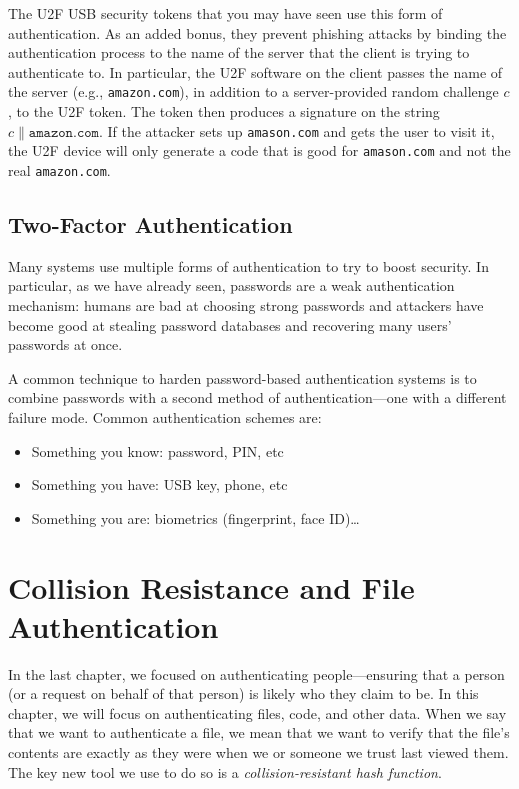 \documentclass[
  letterpaper,
]{scrbook}
\providecommand{\tightlist}{%
  \setlength{\itemsep}{0pt}\setlength{\parskip}{0pt}}
\theoremstyle{definition}
\theoremstyle{plain}
\theoremstyle{plain}
\theoremstyle{remark}
\begin{document}
The U2F USB security tokens that you may have seen use this form of
authentication. As an added bonus, they prevent phishing attacks by
binding the authentication process to the name of the server that the
client is trying to authenticate to. In particular, the U2F software on
the client passes the name of the server (e.g., \texttt{amazon.com}), in
addition to a server-provided random challenge \(c\), to the U2F token.
The token then produces a signature on the string
\(c\|\mathtt{amazon.com}\). If the attacker sets up \texttt{amason.com}
and gets the user to visit it, the U2F device will only generate a code
that is good for \texttt{amason.com} and not the real
\texttt{amazon.com}.

\section{Two-Factor Authentication}\label{two-factor-authentication}

Many systems use multiple forms of authentication to try to boost
security. In particular, as we have already seen, passwords are a weak
authentication mechanism: humans are bad at choosing strong passwords
and attackers have become good at stealing password databases and
recovering many users' passwords at once.

A common technique to harden password-based authentication systems is to
combine passwords with a second method of authentication---one with a
different failure mode. Common authentication schemes are:

\begin{itemize}
\tightlist
\item
  Something you know: password, PIN, etc
\item
  Something you have: USB key, phone, etc
\item
  Something you are: biometrics (fingerprint, face ID)\ldots{}
\end{itemize}

\chapter{Collision Resistance and File
Authentication}\label{collision-resistance-and-file-authentication}

In the last chapter, we focused on authenticating people---ensuring that
a person (or a request on behalf of that person) is likely who they
claim to be. In this chapter, we will focus on authenticating files,
code, and other data. When we say that we want to authenticate a file,
we mean that we want to verify that the file's contents are exactly as
they were when we or someone we trust last viewed them. The key new tool
we use to do so is a \emph{collision-resistant hash function}.
\end{document}
